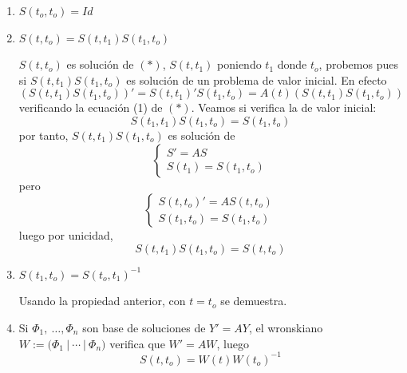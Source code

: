     \begin{propi} \: 
        \begin{enumerate}
            \item $S(t_o,t_o)=Id$
            \item $S(t,t_o)=S(t,t_1)S(t_1,t_o)$
            \begin{dem}
                $S(t,t_o)$ es solución de $(*)$, $S(t,t_1)$ poniendo $t_1$ donde $t_o$, probemos pues si $S(t,t_1)S(t_1,t_o)$ es solución de un problema de valor inicial. En efecto
                $$(S(t,t_1)S(t_1,t_o))'=S(t,t_1)'S(t_1,t_o)=A(t) (S(t,t_1) S(t_1,t_o))$$
                verificando la ecuación (1) de $(*)$. Veamos si verifica la de valor inicial:
                $$S(t_1,t_1)S(t_1,t_o)=S(t_1,t_o)$$
                por tanto, $S(t,t_1) S(t_1,t_o)$ es solución de 
                $$\left\{ \begin{array}{l}
                     S'=AS  \\
                     S(t_1)=S(t_1,t_o) 
                \end{array} \right.$$
                pero 
                $$\left\{ \begin{array}{l}
                     S(t,t_o)'=AS(t,t_o)  \\
                     S(t_1,t_o)=S(t_1,t_o) 
                \end{array} \right.$$
                luego por unicidad, 
                $$S(t,t_1) S(t_1,t_o)=S(t,t_o)$$
            \end{dem}
            \item $S(t_1,t_o)=S(t_o,t_1)^{-1}$
            \begin{dem}
                Usando la propiedad anterior, con $t=t_o$ se demuestra.
            \end{dem}
            \item Si $\Phi_1, \: \ldots, \Phi_n$ son base de soluciones de $Y'=AY$, el wronskiano $W:=\Big( \Phi_1 \: | \: \cdots \: | \:  \Phi_n \Big)$ verifica que $W'=AW$, luego 
            $$S(t,t_o)=W(t) W(t_o)^{-1}$$
        \end{enumerate}
    \end{propi}

